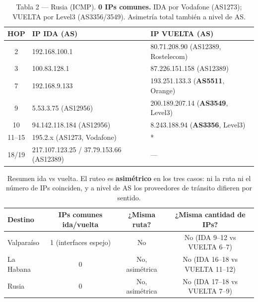 \documentclass[11pt,a4paper]{article}
\begin{document}
\begin{table}[H]
\centering\footnotesize
\begin{tabular}{c|ll}
\toprule
HOP & IP IDA (AS) & IP VUELTA (AS) \\
\midrule
2 & 192.168.100.1 & 80.71.208.90 (AS12389, Rostelecom) \\
3 & 100.83.128.1 & 87.226.151.158 (AS12389) \\
7 & 192.168.9.133 & 193.251.133.3 (\textbf{AS5511}, Orange) \\
9 & 5.53.3.75 (AS12956) & 200.189.207.14 (\textbf{AS3549}, Level3) \\
10 & 94.142.118.184 (AS12956) & 8.243.188.94 (\textbf{AS3356}, Level3) \\
11--15 & 195.2.x (AS1273, Vodafone) & * \\
18/19 & 217.107.123.25 / 37.79.153.66 (AS12389) & --- \\
\bottomrule
\end{tabular}
\caption{Tabla 2 --- Rusia (ICMP). \textbf{0 IPs comunes.} IDA por Vodafone (AS1273); VUELTA por
Level3 (AS3356/3549). Asimetría total también a nivel de AS.}
\end{table}

\begin{table}[H]
\centering\small
\begin{tabular}{lccc}
\toprule
Destino & IPs comunes ida/vuelta & ¿Misma ruta? & ¿Misma cantidad de IPs? \\
\midrule
Valparaíso & 1 (interfaces espejo) & No & No (IDA 9--12 vs VUELTA 6--7) \\
La Habana & 0 & No, asimétrica & No (IDA 16--18 vs VUELTA 11--12) \\
Rusia & 0 & No, asimétrica & No (IDA 17--18 vs VUELTA 7--9) \\
\bottomrule
\end{tabular}
\caption{Resumen ida vs vuelta. El ruteo es \textbf{asimétrico} en los tres casos: ni la ruta ni
el número de IPs coinciden, y a nivel de AS los proveedores de tránsito difieren por sentido.}
\end{table}
\end{document}

